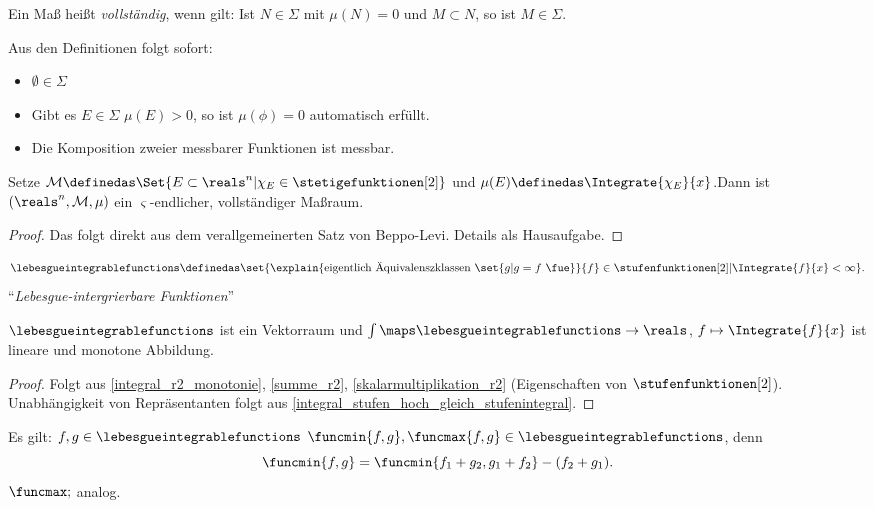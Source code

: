 Ein Maß heißt \emph{vollständig}, wenn gilt: Ist \( N\in \Sigma \) mit \( \mu(N)=0 \) und \( M\subset N \), so ist \( M\in \Sigma \).
\begin{bemerkung*}
  Aus den Definitionen folgt sofort:
  \begin{itemize}
    \item \( \emptyset\in \Sigma \)
    \item Gibt es \( E\in \Sigma \) \sd \( \mu(E)>0 \), so ist \( \mu(\phi)=0 \) automatisch erfüllt.
    \item Die Komposition zweier messbarer Funktionen ist messbar.
  \end{itemize}
\end{bemerkung*}
\begin{satz}
   Setze \( \mathcal{M}\definedas \Set{E\subset \reals^n|\chi_E\in \stetigefunktionen[2]} \) und \( \mu(E)\definedas \Integrate{\chi_E}{x} \).Dann ist \( (\reals^n,\mathcal{M},\mu) \) ein \( \varsigma \)-endlicher, vollständiger Maßraum.
\end{satz}
\begin{proof}
  Das folgt direkt aus dem verallgemeinerten Satz von Beppo-Levi. Details als Hausaufgabe.
\end{proof}
\begin{definition*}
  \begin{equation*}
    \lebesgueintegrablefunctions\definedas \set{\explain{\text{eigentlich Äquivalenszklassen }\set{g|g=f \text{ \fue}}}{f}\in \stufenfunktionen[2]|\Integrate{f}{x}<\infty}.
  \end{equation*}
  \enquote{\emph{Lebesgue-intergrierbare Funktionen}}
\end{definition*}
\begin{proposition}\label{lebesgue_integrable_funktionen_vektorraum}
  \( \lebesgueintegrablefunctions \) ist ein Vektorraum und \( \int \maps \lebesgueintegrablefunctions\to \reals \), \( f\mapsto \Integrate{f}{x} \) ist lineare und monotone Abbildung.
\end{proposition}
\begin{proof}
  Folgt aus \ref{integral_r2_monotonie}, \ref{summe_r2}, \ref{skalarmultiplikation_r2} (Eigenschaften von \( \stufenfunktionen[2] \)). Unabhängigkeit von Repräsentanten folgt aus \ref{integral_stufen_hoch_gleich_stufenintegral}.
  
\end{proof}
\begin{bemerkung*}
  Es gilt: \( f,g\in \lebesgueintegrablefunctions \) \timplies \( \funcmin{f,g},\funcmax{f,g}\in \lebesgueintegrablefunctions \), denn
  \begin{equation*}
    \funcmin{f,g}=\funcmin{f_1+g_2,g_1+f_2}-(f_2+g_1).
  \end{equation*}
  \( \funcmax; \) analog.
\end{bemerkung*}
